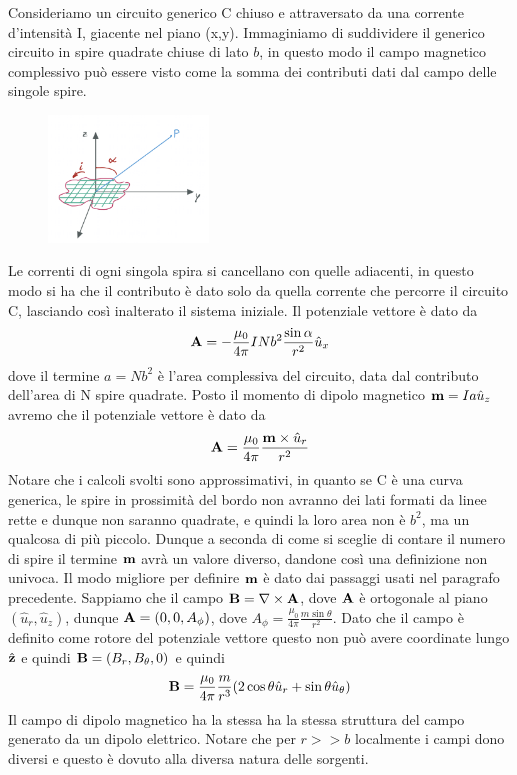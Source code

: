 Consideriamo un circuito generico C chiuso e attraversato da una corrente d'intensit\`a I, giacente nel piano (x,y). Immaginiamo di suddividere il generico circuito in spire quadrate chiuse di lato $b$, in questo modo il campo magnetico complessivo pu\`o essere visto come la somma dei contributi dati dal campo delle singole spire. 
\begin{figure} %
    \centering
    \includegraphics[width=0.38\textwidth]{images/adjointfield} %
\end{figure}
Le correnti di ogni singola spira si cancellano con quelle adiacenti, in questo modo si ha che il contributo \`e dato solo da quella corrente che percorre il circuito C, lasciando cos\`i inalterato il sistema iniziale. Il potenziale vettore \`e dato da 
\begin{equation*}
	\bold{A} = - \frac{\mu_0 }{4 \pi }INb^2\frac{\sin \alpha}{r^2} \hat{u}_x
\end{equation*}
dove il termine $a = Nb^2$ \`e l'area complessiva del circuito, data dal contributo dell'area di N spire quadrate. Posto il momento di dipolo magnetico $\bold{m} = Ia\hat{u}_z$ avremo che il potenziale vettore \`e dato da 
\begin{equation*}
	\bold{A} = \frac{\mu_0}{4\pi} \frac{\bold{m} \times \hat{u}_r}{r^2}
\end{equation*}
Notare che i calcoli svolti sono approssimativi, in quanto se C \`e una curva generica, le spire in prossimit\`a del bordo non avranno dei lati formati da linee rette e dunque non saranno quadrate, e quindi la loro area non \`e $b^2$, ma un qualcosa di pi\`u piccolo. Dunque a seconda di come si sceglie di contare il numero di spire il termine $\bold{m}$ avr\`a un valore diverso, dandone cos\`i una definizione non univoca. Il modo migliore per definire $\bold{m}$ \`e dato dai passaggi usati nel paragrafo precedente. 
\newline
Sappiamo che il campo $\bold{B} = \nabla \times \bold{A}$, dove $\bold{A}$ \`e ortogonale al piano $(\hat{u}_{r},\hat{u}_{z})$, dunque $\bold{A} = (0,0,A_{\phi})$, dove $A_{\phi} = \frac{\mu_0}{4 \pi} \frac{m\sin \theta}{r^2}$. Dato che il campo \`e definito come rotore del potenziale vettore questo non pu\`o avere coordinate lungo $\hat{\bold{z}}$ e quindi $\bold{B} = (B_{r},B_{\theta},0)$ e quindi
\begin{equation*}
	\bold{B} = \frac{\mu_0}{4 \pi}\frac{m}{r^3}(2\cos\theta \hat{u}_{r} +  \sin \theta \hat{u}_{\theta})
\end{equation*} 
Il campo di dipolo magnetico ha la stessa ha la stessa struttura del campo generato da un dipolo elettrico. Notare che per $r>>b$ localmente i campi dono diversi e questo \`e dovuto alla diversa natura delle sorgenti.
\newpage 


